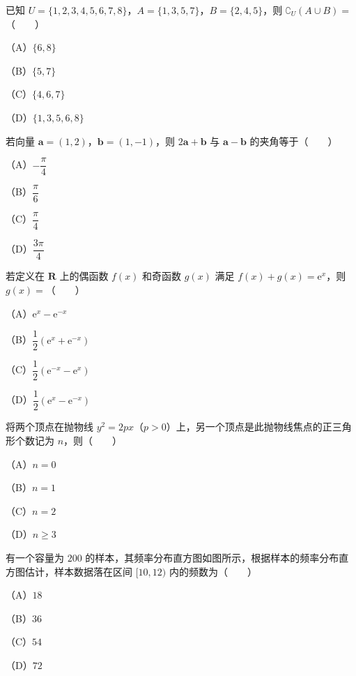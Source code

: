 

\begin{question}
已知 $U=\{1,2,3,4,5,6,7,8\}$，$A=\{1,3,5,7\}$，$B=\{2,4,5\}$，则 $\complement_U(A\cup B)=$\mbox{（　　）}

（A）$\{6,8\}$

（B）$\{5,7\}$

（C）$\{4,6,7\}$

（D）$\{1,3,5,6,8\}$

\end{question}
\begin{question}
若向量 $\boldsymbol a=(1,2)$，$\boldsymbol b=(1,-1)$，则 $2\boldsymbol a+\boldsymbol b$ 与 $\boldsymbol a-\boldsymbol b$ 的夹角等于\mbox{（　　）}

（A）$-\dfrac\pi4$

（B）$\dfrac\pi6$

（C）$\dfrac\pi4$

（D）$\dfrac{3\pi}4$

\end{question}
\begin{question}
若定义在 $\mathbf R$ 上的偶函数 $f(x)$ 和奇函数 $g(x)$ 满足 $f(x)+g(x)=\mathrm e^x$，则 $g(x)=$\mbox{（　　）}

（A）$\mathrm e^x-\mathrm e^{-x}$

（B）$\dfrac12(\mathrm e^x+\mathrm e^{-x})$

（C）$\dfrac12(\mathrm e^{-x}-\mathrm e^x)$

（D）$\dfrac12(\mathrm e^x-\mathrm e^{-x})$

\end{question}
\begin{question}
将两个顶点在抛物线 $y^2=2px$（$p>0$）上，另一个顶点是此抛物线焦点的正三角形个数记为 $n$，则\mbox{（　　）}

（A）$n=0$

（B）$n=1$

（C）$n=2$

（D）$n\geqslant3$

\Needspace{0.4\textheight}
\end{question}
\begin{question}
有一个容量为 $200$ 的样本，其频率分布直方图如图所示，根据样本的频率分布直方图估计，样本数据落在区间 $[10,12)$ 内的频数为\mbox{（　　）}

（A）$18$

（B）$36$

（C）$54$

（D）$72$
\nopagebreak[4]
\begin{center}\end{center}
\nopagebreak[4]
\end{question}
